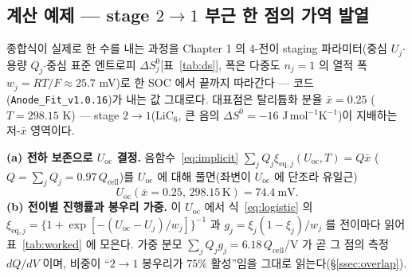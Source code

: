 \documentclass[11pt,a4paper]{article}
\newcommand{\eq}{\mathrm{eq}}
\newcommand{\oc}{\mathrm{oc}}
\newcommand{\cell}{\mathrm{cell}}
\begin{document}
\subsection{계산 예제 — stage $2\!\to\!1$ 부근 한 점의 가역 발열}\label{ssec:worked}
종합식이 실제로 한 수를 내는 과정을 Chapter 1 의 4-전이 staging 파라미터(중심 $U_j$$\cdot$용량 $Q_j$$\cdot$중심 표준
엔트로피 $\Delta S^0_j$[표~\ref{tab:ds}], 폭은 다중도 $n_j{=}1$ 의 열적 폭 $w_j{=}RT/F\!\approx\!25.7$ mV)로 한 SOC 에서
끝까지 따라간다 --- 코드(\texttt{Anode\_Fit\_v1.0.16})가 내는 값 그대로다. 대표점은 탈리튬화 분율 $\bar x=0.25$
($T=298.15$ K) --- stage $2\!\to\!1$($\mathrm{LiC_6}$, 큰 음의 $\Delta S^0=-16$ J\,mol$^{-1}$K$^{-1}$)이 지배하는 저-$\bar x$ 영역이다.

\textbf{(a) 전하 보존으로 $U_\oc$ 결정.} 음함수~\eqref{eq:implicit} $\sum_jQ_j\xi_{\eq,j}(U_\oc,T)=Q\bar x$
($Q=\sum_jQ_j=0.97\,Q_\cell$)를 $U_\oc$ 에 대해 풀면(좌변이 $U_\oc$ 에 단조라 유일근)
\begin{equation*}
U_\oc(\bar x{=}0.25,\,298.15\,\mathrm K)=74.4\ \mathrm{mV}.
\end{equation*}
\textbf{(b) 전이별 진행률과 봉우리 가중.} 이 $U_\oc$ 에서 식~\eqref{eq:logistic} 의
$\xi_{\eq,j}=\{1{+}\exp[-(U_\oc-U_j)/w_j]\}^{-1}$ 과 $g_j=\xi_j(1-\xi_j)/w_j$ 를 전이마다 읽어 표~\ref{tab:worked} 에
모은다. 가중 분모 $\sum_jQ_jg_j=6.18\,Q_\cell$/V 가 곧 그 점의 측정 $dQ/dV$ 이며, 비중이 ``$2\!\to\!1$ 봉우리가
$75\%$ 활성''임을 그대로 읽는다(\S\ref{ssec:overlap}).
\end{document}
